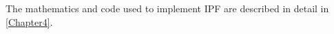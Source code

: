 The mathematics \citep{Fienberg1970} and code
\citep[Supplementary Information]{Lovelace2013-trs} used to implement IPF are
described in detail in \cref{Chapter4}.
% 
% 
